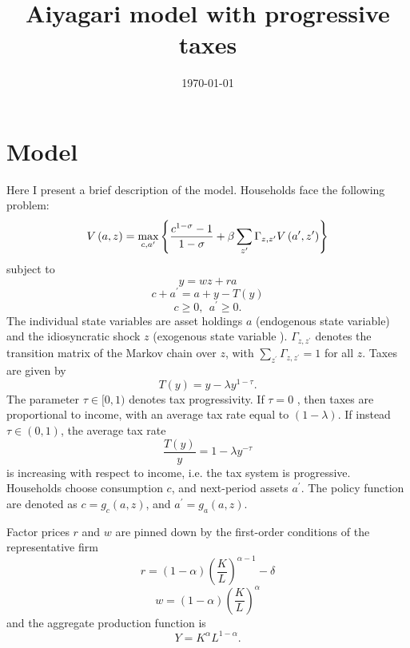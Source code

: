 \documentclass[12pt]{article}
\begin{document}
\title{\textbf{Aiyagari model with progressive taxes}}
\date{\today }
\author{}
\maketitle

\section{Model}

Here I present a brief description of the model. Households face the
following problem:%
\begin{equation*}
V\left( a,z\right) =\max_{c,a^{\prime }}\left\{ \frac{c^{1-\sigma }-1}{%
1-\sigma }+\beta \sum_{z^{\prime }}\Gamma _{z,z^{\prime }}V\left( a^{\prime
},z^{\prime }\right) \right\} 
\end{equation*}%
subject to%
\begin{equation*}
y=wz+ra
\end{equation*}%
\begin{equation*}
c+a^{\prime }=a+y-T(y)
\end{equation*}%
\begin{equation*}
c\geq 0,\ \ a^{\prime }\geq 0.
\end{equation*}%
The individual state variables are asset holdings $a$ (endogenous state
variable) and the idiosyncratic shock $z$ (exogenous state variable ). $%
\Gamma _{z,z^{\prime }}$ denotes the transition matrix of the Markov chain
over $z$, with $\sum_{z^{\prime }}\Gamma _{z,z^{\prime }}=1$ for all $z$.
Taxes are given by%
\begin{equation*}
T(y)=y-\lambda y^{1-\tau }.
\end{equation*}%
The parameter $\tau \in \lbrack 0,1)$ denotes tax progressivity. If $\tau =0$%
, then taxes are proportional to income, with an average tax rate equal to $%
\left( 1-\lambda \right) $. If instead $\tau \in \left( 0,1\right) $, the
average tax rate%
\begin{equation*}
\frac{T(y)}{y}=1-\lambda y^{-\tau }
\end{equation*}%
is increasing with respect to income, i.e. the tax system is progressive.
Households choose consumption $c$, and next-period assets $a^{\prime }$. The
policy function are denoted as $c=g_{c}\left( a,z\right) $, and $a^{\prime
}=g_{a}\left( a,z\right) $.

Factor prices $r$ and $w$ are pinned down by the first-order conditions of
the representative firm%
\begin{equation*}
r=\left( 1-\alpha \right) \left( \frac{K}{L}\right) ^{\alpha -1}-\delta 
\end{equation*}%
\begin{equation*}
w=\left( 1-\alpha \right) \left( \frac{K}{L}\right) ^{\alpha }
\end{equation*}%
and the aggregate production function is 
\begin{equation*}
Y=K^{\alpha }L^{1-\alpha }.
\end{equation*}
\end{document}
